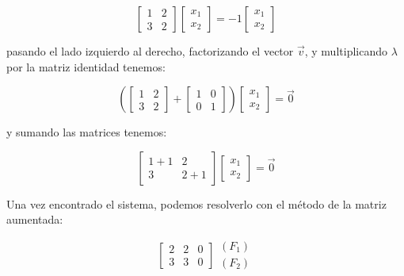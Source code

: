 \documentclass[
]{book}
\begin{document}
\begin{equation}
\left[\begin{array}{cc} 1 & 2 \\ 3 & 2 \end{array}\right] 
\left[\begin{array}{c} x_1 \\ x_2 \end{array} \right] =
-1 \left[\begin{array}{c} x_1 \\ x_2 \end{array} \right]
\end{equation}

pasando el lado izquierdo al derecho, factorizando el vector \(\vec{v}\), y multiplicando \(\lambda\) por la matriz identidad tenemos:

\begin{equation}
\left(
\left[\begin{array}{cc} 1 & 2 \\ 3 & 2 \end{array}\right] +
\left[\begin{array}{cc} 1 & 0 \\ 0 & 1 \end{array} \right] \right) \left[\begin{array}{c} x_1 \\ x_2 \end{array} \right] = \vec{0}
\end{equation}

y sumando las matrices tenemos:

\begin{equation}
\left[\begin{array}{cc} 1 + 1 & 2 \\ 3 & 2 + 1 \end{array}\right] \left[\begin{array}{c} x_1 \\ x_2 \end{array} \right] = \vec{0}
\end{equation}

Una vez encontrado el sistema, podemos resolverlo con el método de la matriz aumentada:

\begin{equation}
\left[ \begin{array}{cc|c}
2 & 2 & 0 \\
3 & 3 & 0
\end{array}\right] 
\begin{array}{c}
(F_1) \\ (F_2)
\end{array}
\end{equation}
\end{document}
